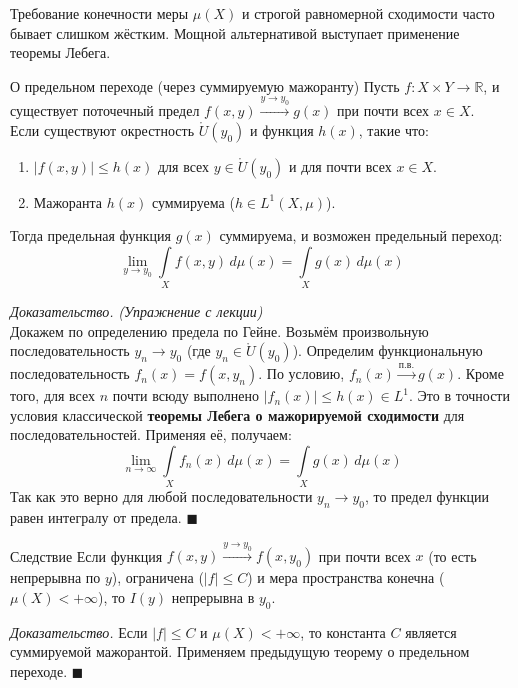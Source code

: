 \documentclass[12pt,a4paper]{article}
\newenvironment{Proof}[1][Доказательство]{\vspace{0.5em}\noindent\textit{#1.}\hspace{0.5em}\ignorespaces}{\hfill$\blacksquare$\vspace{1em}}
\begin{document}
Требование конечности меры $\mu(X)$ и строгой равномерной сходимости часто бывает слишком жёстким. Мощной альтернативой выступает применение теоремы Лебега.

\begin{Theorem}{О предельном переходе (через суммируемую мажоранту)}{}
Пусть $f: X \times Y \to \mathbb{R}$, и существует поточечный предел $f(x,y) \xrightarrow{y \to y_0} g(x)$ при почти всех $x \in X$. \\
Если существуют окрестность $\mathring{U}(y_0)$ и функция $h(x)$, такие что:
\begin{enumerate}
    \item $|f(x,y)| \le h(x)$ для всех $y \in \mathring{U}(y_0)$ и для почти всех $x \in X$.
    \item Мажоранта $h(x)$ суммируема ($h \in L^1(X, \mu)$).
\end{enumerate}
Тогда предельная функция $g(x)$ суммируема, и возможен предельный переход:
$$ \lim\limits_{y \to y_0} \int\limits_X f(x,y) \, d\mu(x) = \int\limits_X g(x) \, d\mu(x) $$
\end{Theorem}

\begin{Proof}
\textit{(Упражнение с лекции)} \\
Докажем по определению предела по Гейне. Возьмём произвольную последовательность $y_n \to y_0$ (где $y_n \in \mathring{U}(y_0)$). Определим функциональную последовательность $f_n(x) = f(x, y_n)$.
По условию, $f_n(x) \xrightarrow{\text{п.в.}} g(x)$.
Кроме того, для всех $n$ почти всюду выполнено $|f_n(x)| \le h(x) \in L^1$.
Это в точности условия классической \textbf{теоремы Лебега о мажорируемой сходимости} для последовательностей. Применяя её, получаем:
$$ \lim\limits_{n \to \infty} \int\limits_X f_n(x) \, d\mu(x) = \int\limits_X g(x) \, d\mu(x) $$
Так как это верно для любой последовательности $y_n \to y_0$, то предел функции равен интегралу от предела.
\end{Proof}

\begin{Theorem}{Следствие}{}
Если функция $f(x,y) \xrightarrow{y \to y_0} f(x, y_0)$ при почти всех $x$ (то есть непрерывна по $y$), ограничена ($|f| \le C$) и мера пространства конечна ($\mu(X) < +\infty$), то $I(y)$ непрерывна в $y_0$.
\end{Theorem}

\begin{Proof}
Если $|f| \le C$ и $\mu(X) < +\infty$, то константа $C$ является суммируемой мажорантой. Применяем предыдущую теорему о предельном переходе.
\end{Proof}
\end{document}
